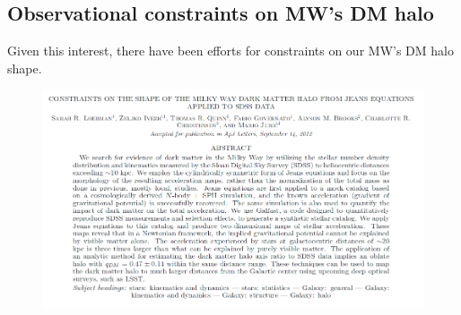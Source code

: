 \documentclass[xcolor=dvipsnames]{beamer}
\begin{document}
\subsection{Observational constraints on MW's DM halo}
\begin{frame}

Given this interest, there have been efforts for constraints on our MW's DM halo shape. \cite{Loebman2012,LawMajewski2010,Vera-Ciro2013,}

\begin{figure}[c]
\includegraphics[width=1\linewidth]{./pics/loebmanJean.png}
\end{figure}


\end{frame}
\end{document}
